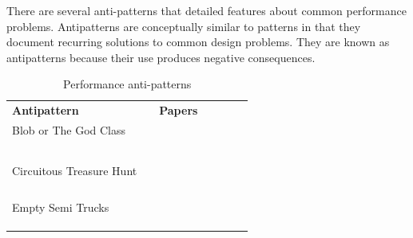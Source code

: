 \documentclass[espaco=umemeio,chapter=TITLE,twoside,openright]{abnt}
\begin{document}
There are several anti-patterns that detailed features about  common performance problems. Antipatterns are conceptually similar to patterns in that they document recurring solutions to common design problems. They are known as
antipatterns because their use produces negative consequences.

\begin{table}[!h]
\centering
\caption{Performance anti-patterns}
\label{antipatterns}
\begin{tabular}{|l|l|l|llll}
\cline{1-3}
\multicolumn{2}{|l|}{\cellcolor[HTML]{C0C0C0}\textbf{Antipattern}}     & \cellcolor[HTML]{C0C0C0}\textbf{Papers}                                                                        &  &  &  &  \\ \cline{1-3}
Blob or The God Class                   &                              & \begin{minipage}{0.3\textwidth} \cite{Wert2014} \\ \cite{Smith2000} \\ \cite{Trubiani2011} \\\cite{Vetoio2011} \\ \cite{Cortellessa2007} \\\cite{Smith2003} \end{minipage} &  &  &  &  \\ \cline{1-1} \cline{3-3}
Circuitous Treasure Hunt                &                              & \begin{minipage}{0.4\textwidth} \cite{Wert2014} \\ \cite{Trubiani2011}  \\ \cite{Vetoio2011} \\ \cite{Smith2003} \\ \cite{Smith2002} \end{minipage}                        &  &  &  &  \\ \cline{1-1} \cline{3-3}
Empty Semi Trucks                       &                              & \begin{minipage}{0.3\textwidth} \cite{Wert2014} \\\cite{Trubiani2011} \\ \cite{Arcelli2012} \\ \cite{Vetoio2011}                                       \end{minipage} &  &  &  &  \\ \cline{1-1} \cline{3-3}

\end{tabular}
\end{table}
\end{document}
